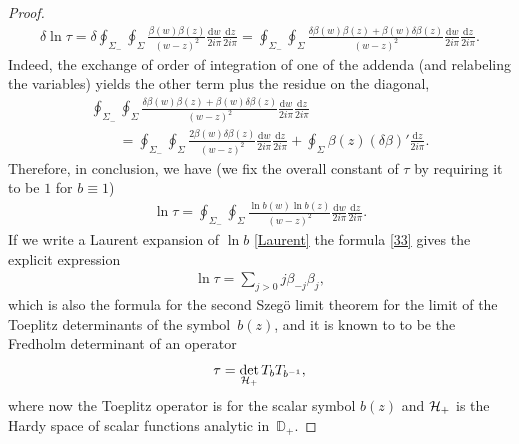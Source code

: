 \documentclass[pdftex]{sigma}
\numberwithin{equation}{section}
\def \ddz{ \frac {\d z}{2i\pi}}
\def \ddw{ \frac {\d w}{2i\pi}}
\def\D{\mathbb D}
\def\H{{\cal H}}
\def\d{\mathrm d}
\begin{document}
\begin{proof}
\begin{gather*}
\delta \ln \tau = \delta \oint_{\Sigma_-} \oint_{\Sigma} \frac {\beta(w) \beta(z)}{(w-z)^2} \ddw \ddz=
 \oint_{\Sigma_-} \oint_{\Sigma} \frac {\delta \beta(w) \beta(z) + \beta(w) \delta \beta(z)}{(w-z)^2} \ddw \ddz.
\end{gather*}
Indeed, the exchange of order of integration of one of the addenda (and relabeling the variables) yields the other term plus the residue on the diagonal,
\begin{gather*}
 \oint_{\Sigma_-} \oint_{\Sigma} \frac {\delta \beta(w) \beta(z) + \beta(w) \delta \beta(z)}{(w-z)^2} \ddw \ddz\\
 \qquad{} =
 \oint_{\Sigma_-} \oint_{\Sigma} \frac {2 \beta(w) \delta \beta(z)}{(w-z)^2} \ddw \ddz + \oint_{\Sigma } {\beta(z) (\delta \beta)' }\ddz.
\end{gather*}
Therefore, in conclusion, we have (we f\/ix the overall constant of $\tau$ by requiring it to be $1$ for $b\equiv 1$)
\begin{gather}
\ln \tau = \oint_{\Sigma_-} \oint_{\Sigma} \frac {\ln b(w) \ln b (z)}{(w-z)^2} \ddw \ddz. \label{33}
\end{gather}
If we write a Laurent expansion of $\ln b$ \eqref{Laurent} the formula \eqref{33} gives the explicit expression
\begin{gather*}
\ln \tau = \sum_{j>0} j \beta_{-j} \beta_j,
\end{gather*}
which is also the formula for the second Szeg\"o limit theorem for the limit of the Toeplitz determinants of the symbol~$b(z)$, and it is known to to be the Fredholm determinant of an opera\-tor~\mbox{\cite{BasorWidom-BO, BorodinOkounkov}}
\begin{gather*}
\tau = \det_{\H_+} T_b T_{b^{-1}},
\end{gather*}
where now the Toeplitz operator is for the scalar symbol $b(z)$ and $\H_+$ is the Hardy space of scalar functions analytic in~$\D_+$.
\end{proof}
\end{document}
